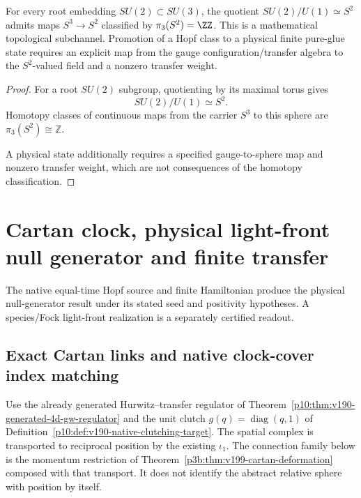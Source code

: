 \documentclass[12pt,a4paper]{article}
\begin{document}
\begin{theorem}
\label{p10:thm:native-hopf-sectors}
For every root embedding \(SU(2)\subset SU(3)\), the quotient \(SU(2)/U(1)\simeq S^2\) admits maps \(S^3\to S^2\) classified by \(\pi_3(S^2)=\ZZ\).  This is a mathematical topological subchannel.  Promotion of a Hopf class to a physical finite pure-glue state requires an explicit map from the gauge configuration/transfer algebra to the \(S^2\)-valued field and a nonzero transfer weight.
\end{theorem}
\begin{proof}
For a root $SU(2)$ subgroup, quotienting by its maximal torus gives
\[
SU(2)/U(1)\simeq S^2.
\]
Homotopy classes of continuous maps from the carrier $S^3$ to this
sphere are $\pi_3(S^2)\cong\mathbb Z$.

A physical state additionally requires a specified gauge-to-sphere map
and nonzero transfer weight, which are not consequences of the homotopy
classification.
\end{proof}



\section{Cartan clock, physical light-front null generator and finite transfer}
\label{p10:sec:v237-a6}
The native equal-time Hopf source and finite Hamiltonian produce the physical null-generator result under its stated seed and positivity hypotheses. A species/Fock light-front realization is a separately certified readout.

\subsection{Exact Cartan links and native clock-cover index matching}
\label{p10:sec:v199-native-geometric-index}
Use the already generated Hurwitz--transfer regulator of
Theorem~\ref{p10:thm:v190-generated-4d-gw-regulator} and the unit clutch
\(g(q)=\operatorname{diag}(q,1)\) of
Definition~\ref{p10:def:v190-native-clutching-target}.  The spatial complex
is transported to reciprocal position by the existing \(\iota_1\).
The connection family below is the momentum restriction of
Theorem~\ref{p3b:thm:v199-cartan-deformation} composed with that transport.
It does not identify the abstract relative sphere with position by itself.
\end{document}
